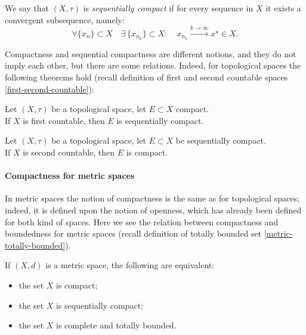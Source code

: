 \begin{defn}\label{seq-compact-space-defn}
	We say that $(X, \tau)$ is \emph{sequentially compact} if for every sequence in $X$ it exists a convergent subsequence, namely: 
	$$\forall \{x_n\} \subset X \quad \exists \, \{ x_{n_k} \} \subset X : \quad x_{n_k} \xrightarrow{k\to\infty} x^\star \in X.$$ 
\end{defn}

Compactness and sequential compactness are different notions, and they do not imply each other, but there are some relations. Indeed, for topological spaces the following theorems hold (recall definition of first and second countable spaces \vref{first-second-countable}):

\begin{theo}
	Let $(X,\tau)$ be a topological space, let $E\subset X$ compact.\\
	If $X$ is first countable, then $E$ is sequentially compact.
\end{theo}

\begin{theo}
	Let $(X, \tau)$ be a topological space, let $E\subset X$ be sequentially compact.\\
	If $X$ is second countable, then $E$ is compact.
\end{theo}

\paragraph{Compactness for metric spaces} In metric spaces the notion of compactness is the same as for topological spaces; indeed, it is defined upon the notion of openness, which has already been defined for both kind of spaces. Here we see the relation between compactness and boundedness for metric spaces (recall definition of totally bounded set \vref{metric-totally-bounded}).
    
\begin{theo}\label{characterization-compact-spaces}
    If $(X,d)$ is a metric space, the following are equivalent:
    \begin{itemize}
        \item the set $X$ is compact;
        \item the set $X$ is sequentially compact;
        \item the set $X$ is complete and totally bounded.
    \end{itemize}
\end{theo}

